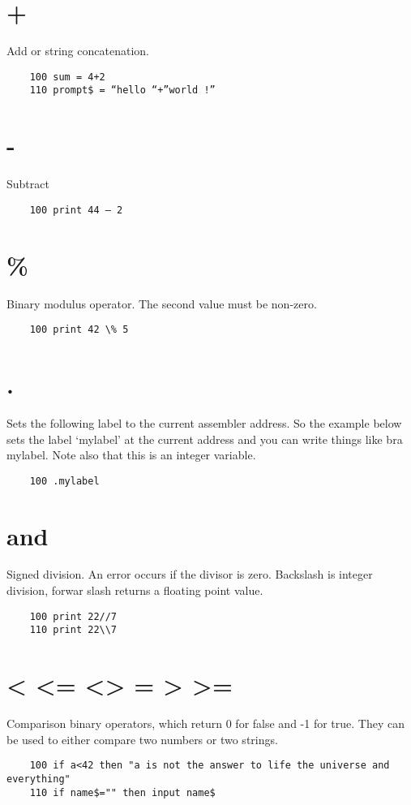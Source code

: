 \section*{+}
Add or string concatenation.
\example{}
\begin{verbatim}
	100 sum = 4+2
	110 prompt$ = “hello “+”world !”
\end{verbatim}

\section*{-}
Subtract
\example{}
\begin{verbatim}
	100 print 44 – 2
\end{verbatim}

\section*{\%}
Binary modulus operator. The second value must be non-zero.
\example{}
\begin{verbatim}
	100 print 42 \% 5
\end{verbatim}

\section*{.}
Sets the following label to the current assembler address. So the example below sets the label ‘mylabel’ at the current address and you can write things like bra mylabel. Note also that this is an integer variable.
\example{}
\begin{verbatim}
	100 .mylabel
\end{verbatim}

\section*{\/ and \\}
Signed division. An error occurs if the divisor is zero. Backslash is integer division, forwar slash returns a floating point value.
\example{}
\begin{verbatim}
	100 print 22//7
	110 print 22\\7
\end{verbatim}

\section*{< <= <> = > >=}
Comparison binary operators, which return 0 for false and -1 for true. They can be used to either compare two numbers or two strings.
\example{}
\begin{verbatim}
	100 if a<42 then "a is not the answer to life the universe and everything"
	110 if name$="" then input name$
\end{verbatim}

